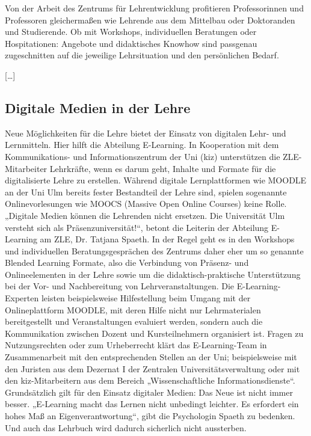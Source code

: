 Von der Arbeit des Zentrums für Lehrentwicklung profitieren Professorinnen und Professoren gleichermaßen wie Lehrende aus dem Mittelbau oder Doktoranden und Studierende. Ob mit Workshops, individuellen Beratungen oder Hospitationen: Angebote und didaktisches Knowhow sind passgenau zugeschnitten auf die jeweilige Lehrsituation und den persönlichen Bedarf. 

[\ldots]

\subsection{Digitale Medien in der Lehre}
\label{subsec:1.1}

\begin{spacing}{1.15} %
    Neue Möglichkeiten für die Lehre bietet der Einsatz von digitalen Lehr- und Lernmitteln. Hier hilft die Abteilung E-Learning. In Kooperation mit dem  Kommunikations- und Informationszentrum der Uni (kiz) unterstützen die ZLE-Mitarbeiter Lehrkräfte, wenn es darum geht, Inhalte und Formate für die digitalisierte Lehre zu erstellen. Während digitale Lernplattformen wie MOODLE an der Uni Ulm bereits fester Bestandteil der Lehre sind, spielen sogenannte Onlinevorlesungen wie MOOCS (Massive Open Online Courses) keine Rolle. „Digitale Medien können die Lehrenden nicht ersetzen. Die Universität Ulm versteht sich als Präsenzuniversität!“, betont die Leiterin der Abteilung E-Learning am ZLE, Dr. Tatjana Spaeth. In der Regel geht es in den Workshops und individuellen Beratungsgesprächen des Zentrums daher eher um so genannte Blended Learning Formate, also die Verbindung von Präsenz- und Onlineelementen in der Lehre sowie um die didaktisch-praktische Unterstützung bei der Vor- und Nachbereitung von Lehrveranstaltungen. Die E-Learning-Experten leisten beispielsweise Hilfestellung beim Umgang mit der Onlineplattform MOODLE, mit deren Hilfe nicht nur Lehrmaterialen bereitgestellt und Veranstaltungen evaluiert werden, sondern auch die Kommunikation zwischen Dozent und Kursteilnehmern organisiert ist. Fragen zu Nutzungsrechten oder zum Urheberrecht klärt das E-Learning-Team in Zusammenarbeit mit den entsprechenden Stellen an der Uni; beispielsweise mit den Juristen aus dem Dezernat I der Zentralen Universitätsverwaltung oder mit den kiz-Mitarbeitern aus dem Bereich „Wissenschaftliche Informationsdienste“. Grundsätzlich gilt für den Einsatz digitaler Medien: Das Neue ist nicht immer besser. „E-Learning macht das Lernen nicht unbedingt leichter. Es erfordert ein hohes Maß an Eigenverantwortung“, gibt die Psychologin Spaeth zu bedenken. Und auch das Lehrbuch wird dadurch sicherlich nicht aussterben. 
\end{spacing}

